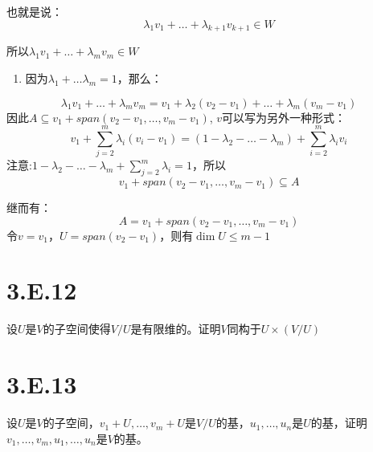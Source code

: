 \documentclass[10pt,a4paper,UTF8]{article}
\begin{document}
\begin{answer}
也就是说：
\begin{equation}
\label{eq:10}
\lambda_{1}v_{1} + \ldots + \lambda_{k+1}v_{k+1} \in W
\end{equation}

所以\(\lambda_{1}v_{1} + \ldots + \lambda_{m}v_{m}\in W\)

\begin{enumerate}
\item 因为\(\lambda_{1} + \ldots \lambda_{m} = 1\)，那么：
\end{enumerate}
\begin{equation}
\label{eq:11}
\lambda_{1}v_{1} + \ldots + \lambda_{m}v_{m} = v_{1} + \lambda_{2}(v_{2} -v_{1}) + \ldots + \lambda_{m}(v_{m} - v_{1})
\end{equation}
因此\(A\subseteq v_{1} + span(v_{2} - v_{1},\ldots ,v_{m}-v_{1})\), \(v\)可以写为另外一种形式：
\begin{equation}
\label{eq:12}
v_{1} + \sum_{j=2}^{m}\lambda_{i}(v_{i} - v_{1}) = (1-\lambda_{2} - \ldots -\lambda_{m}) + \sum_{i=2}^{m}\lambda_{i}v_{i}
\end{equation}
注意:\(1-\lambda_{2} - \ldots -\lambda_{m} + \sum_{j=2}^{m}\lambda_{i} = 1\)，所以
\begin{equation}
\label{eq:13}
v_{1} + span(v_{2}-v_{1},\ldots ,v_{m} - v_{1}) \subseteq A
\end{equation}

继而有：
\begin{equation}
\label{eq:14}
A = v_{1} + span(v_{2} - v_{1},\ldots ,v_{m}-v_{1})
\end{equation}
令\(v=v_{1}\)，\(U = span(v_{2} -v_{1})\)，则有\(\dim U \leq m-1\)
\end{answer}
\section{3.E.12}
\label{sec:org5a314c7}


\begin{problem}
设\(U\)是\(V\)的子空间使得\(V/U\)是有限维的。证明\(V\)同构于\(U\times (V/U)\)
\end{problem}

\begin{answer}

\end{answer}
\section{3.E.13}
\label{sec:org1eba348}


\begin{problem}
设\(U\)是\(V\)的子空间，\(v_{1} + U,\ldots ,v_{m} + U\)是\(V/U\)的基，\(u_{1},\ldots ,u_{n}\)是\(U\)的基，证明\(v_{1},\ldots ,v_{m},u_{1},\ldots ,u_{n}\)是\(V\)的基。
\end{problem}

\begin{answer}

\end{answer}
\end{document}
